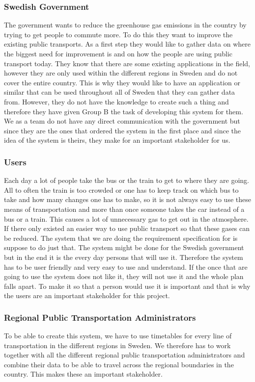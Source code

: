 \documentclass[a4paper]{article}
\begin{document}
			\subsubsection{Swedish Government}
			The government wants to reduce the greenhouse gas emissions in the country by trying to get people to commute more. To do this they want to improve the existing public transports. As a first step they would like to gather data on where the biggest need for improvement is and on how the people are using public transport today. They know that there are some existing applications in the field, however they are only used within the different regions in Sweden and do not cover the entire country. This is why they would like to have an application or similar that can be used throughout all of Sweden that they can gather data from. However, they do not have the knowledge to create such a thing and therefore they have given Group B the task of developing this system for them. We as a team do not have any direct communication with the government but since they are the ones that ordered the system in the first place and since the idea of the system is theirs, they make for an important stakeholder for us. 

			\subsubsection{Users}
			Each day a lot of people take the bus or the train to get to where they are going. All to often the train is too crowded or one has to keep track on which bus to take and how many changes one has to make, so it is not always easy to use these means of transportation and more than once someone takes the car instead of a bus or a train. This causes a lot of unnecessary gas to get out in the atmosphere. If there only existed an easier way to use public transport so that these gases can be reduced. The system that we are doing the requirement specification for is suppose to do just that. The system might be done for the Swedish government but in the end it is the every day persons that will use it. Therefore the system has to be user friendly and very easy to use and understand. If the once that are going to use the system does not like it, they will not use it and the whole plan falls apart. To make it so that a person would use it is important and that is why the users are an important stakeholder for this project.

			\subsubsection{Regional Public Transportation Administrators}
			To be able to create this system, we have to use timetables for every line of transportation in the different regions in Sweden. We therefore has to work together with all the different regional public transportation administrators and combine their data to be able to travel across the regional boundaries in the country. This makes these an important stakeholder.
\end{document}
